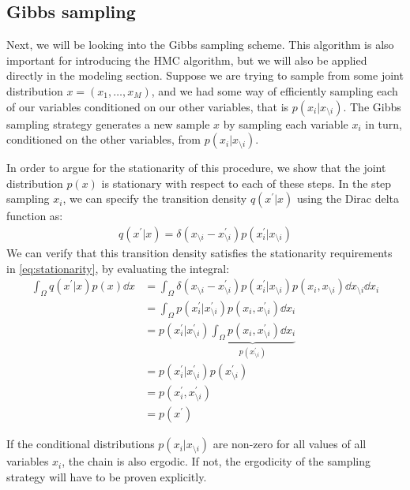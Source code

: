 \subsection{Gibbs sampling}
Next, we will be looking into the Gibbs sampling scheme.
This algorithm is also important for introducing the HMC algorithm, but we will also be applied directly in the modeling section.
Suppose we are trying to sample from some joint distribution $x=(x_1,\dots, x_M)$, and we had some way of efficiently sampling each of our variables conditioned on our other variables, that is $p(x_i|x_{\setminus i})$.
The Gibbs sampling strategy generates a new sample $x$ by sampling each variable $x_i$ in turn, conditioned on the other variables, from $p(x_i|x_{\setminus i})$.  

In order to argue for the stationarity of this procedure, we show that the joint distribution $p(x)$ is stationary with respect to each of these steps. 
In the step sampling $x_i$, we can specify the transition density $q(x^\prime| x)$ using the Dirac delta function as:
\begin{align}
    q(x^\prime| x) = \delta(x_{\setminus i} -x^\prime_{\setminus i}) p(x_i^\prime|x_{\setminus i})
\end{align}
We can verify that this transition density satisfies the stationarity requirements in \cref{eq:stationarity}, by evaluating the integral:
\begin{align}
    \int_{\Omega} q(x^\prime| x) p(x) \dd{x}  
    &= \int_{\Omega}   \delta(x_{\setminus i} -x^\prime_{\setminus i}) p(x_i^\prime|x_{\setminus i}) p(x_i,x_{\setminus i}) \dd{x_{\setminus i}} \dd{x_i} \\
    &= \int_{\Omega} p(x^\prime_i|x^\prime_{\setminus i}) p(x_i,x^\prime_{\setminus i}) \dd{x_i} \\ 
    &= p(x^\prime_i|x^\prime_{\setminus i}) \underbrace{\int_{\Omega}  p(x_i,x^\prime_{\setminus i}) \dd{x_i}}_{p(x^\prime_{\setminus i})} \\ 
    &= p(x^\prime_i|x^\prime_{\setminus i}) p(x^\prime_{\setminus i})  \\
    &=  p(x^\prime_i,x^\prime_{\setminus i})  \\
    &= p(x^\prime)
\end{align}

If the conditional distributions $p(x_i|x_{\setminus i})$ are non-zero for all values of all variables $x_i$, the chain is also ergodic.
If not, the ergodicity of the sampling strategy will have to be proven explicitly.

